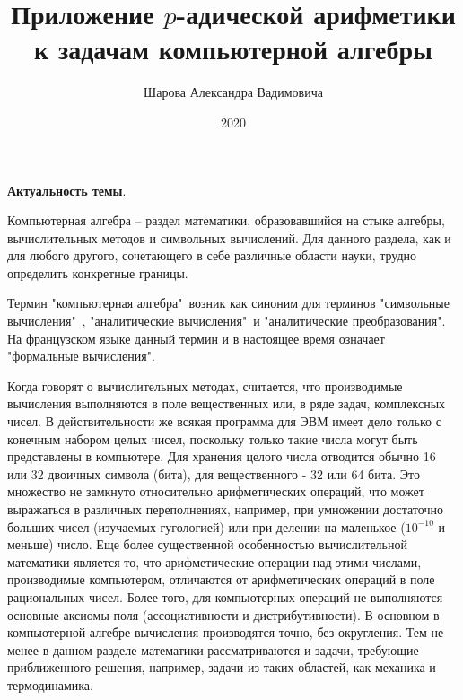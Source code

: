 \documentclass[master, och, autoref, times]{sty/SCWorks}
\theoremstyle{plain}
\theoremstyle{definition}
\numberwithin{equation}{section}
\begin{document}
\title{Приложение $p$-адической арифметики к задачам компьютерной алгебры}

\author{Шарова Александра Вадимовича}

\date{2020}

\maketitle

\intro

\textbf{Актуальность темы}.

Компьютерная алгебра -- раздел математики, образовавшийся на стыке алгебры, вычислительных методов и символьных вычислений. Для данного раздела, как и для любого другого, сочетающего в себе различные области науки, трудно определить конкретные границы.

Термин "компьютерная алгебра"\ возник как синоним для терминов "символьные вычисления"\ , "аналитические вычисления"\ и "аналитические преобразования". На французском языке данный термин и в настоящее время означает "формальные вычисления".

Когда говорят о вычислительных методах, считается, что производимые вычисления выполняются в поле вещественных или, в ряде задач, комплексных чисел. В действительности же всякая программа для ЭВМ имеет дело только с конечным набором целых чисел, поскольку только такие числа могут быть представлены в компьютере. Для хранения целого числа отводится обычно 16 или 32 двоичных символа (бита), для вещественного - 32 или 64 бита. Это множество не замкнуто относительно арифметических операций, что может выражаться в различных переполнениях, например, при умножении достаточно больших чисел (изучаемых гугологией) или при делении на маленькое ($10^{-10}$ и меньше) число. Еще более  существенной особенностью вычислительной математики является то, что арифметические операции над этими числами, производимые компьютером, отличаются от арифметических операций в поле рациональных чисел. Более того, для компьютерных операций не выполняются основные аксиомы поля (ассоциативности и дистрибутивности). В основном в компьютерной алгебре вычисления производятся точно, без округления. Тем не менее в данном разделе математики рассматриваются и задачи, требующие приближенного решения, например, задачи из таких областей, как механика и термодинамика.
\end{document}
